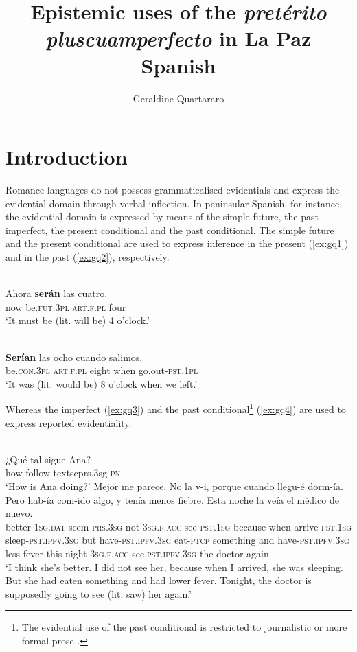 \documentclass[output=paper]{langsci/langscibook}
\author{Geraldine Quartararo \affiliation{Department of Romance Studies and Classics, Stockholm University}}
\title{Epistemic uses of the \textit{pretérito} \textit{pluscuamperfecto} in La Paz Spanish}
\begin{document}
\maketitle

\section{Introduction} 
Romance languages do not possess grammaticalised evidentials and express the evidential domain through verbal inflection. In peninsular Spanish, for instance, the evidential domain is expressed by means of the simple future, the past imperfect, the present conditional and the past conditional. The simple future and the present conditional are used to express inference in the present (\ref{ex:gq1}) and in the past (\ref{ex:gq2}), respectively. 


\ea \label{ex:gq1}
	\\
	\gll Ahora \textbf{serán} las cuatro.\\
	now  be.\textsc{fut.3pl} \textsc{art.f.pl} four\\
	\glt ‘It must be (lit. will be) 4 o’clock.’
	\z


	\ea \label{ex:gq2}
	\\
	\gll \textbf{Serían} las ocho  cuando  salimos.\\
	be.\textsc{con.3pl} \textsc{art.f.pl} eight when go.out-\textsc{pst.1pl}\\
	\glt ‘It was (lit. would be) 8 o’clock when we left.’
	\z


Whereas the imperfect (\ref{ex:gq3}) and the past conditional\footnote{The evidential use of the past conditional is restricted to journalistic or more formal prose \citep[33]{Reyes1996}.}  (\ref{ex:gq4}) are used to express reported evidentiality. 


\ea \label{ex:gq3}
\\
	\ea \label{ex:gq3a}
		\gll ¿{Qué tal} sigue Ana?\\
		how follow-textsc{prs.3sg} \textsc{pn}\\
		\glt ‘How is Ana doing?’
	\ex \label{ex:gq3b}
	\gll Mejor me parece. No la v-i, porque cuando llegu-é dorm-ía. Pero hab-ía com-ido  algo, y tenía menos fiebre. Esta noche la veía el médico {de nuevo}.\\
    better \textsc{1sg.dat} seem-\textsc{prs.3sg} not \textsc{3sg.f.acc} see-\textsc{pst.1sg} because when arrive-\textsc{pst.1sg} sleep-\textsc{pst.ipfv.3sg} but have-\textsc{pst.ipfv.3sg} eat-\textsc{ptcp} something and have-\textsc{pst.ipfv.3sg} less fever this night \textsc{3sg.f.acc} see.\textsc{pst.ipfv.3sg} the  doctor again\\
	\glt ‘I think she’s better. I did not see her, because when I arrived, she was sleeping. But she had eaten something and had lower fever. Tonight, the doctor is supposedly going to see (lit. saw) her again.’
	\z
\z
\end{document}

